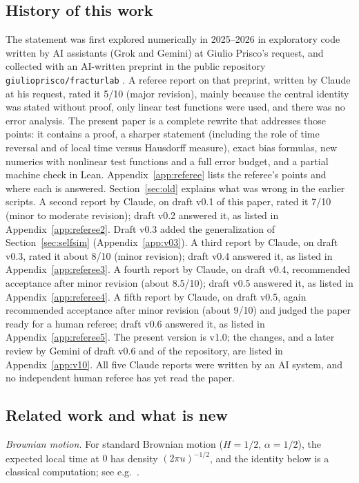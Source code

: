 \documentclass[11pt]{article}
\theoremstyle{remark}
\theoremstyle{definition}
\begin{document}
\subsection{History of this work}
The statement was first explored numerically in 2025--2026 in exploratory code written by AI assistants (Grok and Gemini) at Giulio Prisco's request, and collected with an AI-written preprint in the public repository \texttt{giulioprisco/fracturlab} \cite{fracturlab,Pri26}. A referee report on that preprint, written by Claude at his request, rated it 5/10 (major revision), mainly because the central identity was stated without proof, only linear test functions were used, and there was no error analysis. The present paper is a complete rewrite that addresses those points: it contains a proof, a sharper statement (including the role of time reversal and of local time versus Hausdorff measure), exact bias formulas, new numerics with nonlinear test functions and a full error budget, and a partial machine check in Lean. Appendix~\ref{app:referee} lists the referee's points and where each is answered. Section~\ref{sec:old} explains what was wrong in the earlier scripts. A second report by Claude, on draft v0.1 of this paper, rated it 7/10 (minor to moderate revision); draft v0.2 answered it, as listed in Appendix~\ref{app:referee2}. Draft v0.3 added the generalization of Section~\ref{sec:selfsim} (Appendix~\ref{app:v03}). A third report by Claude, on draft v0.3, rated it about 8/10 (minor revision); draft v0.4 answered it, as listed in Appendix~\ref{app:referee3}. A fourth report by Claude, on draft v0.4, recommended acceptance after minor revision (about 8.5/10); draft v0.5 answered it, as listed in Appendix~\ref{app:referee4}. A fifth report by Claude, on draft v0.5, again recommended acceptance after minor revision (about 9/10) and judged the paper ready for a human referee; draft v0.6 answered it, as listed in Appendix~\ref{app:referee5}. The present version is v1.0; the changes, and a later review by Gemini of draft v0.6 and of the repository, are listed in Appendix~\ref{app:v10}. All five Claude reports were written by an AI system, and no independent human referee has yet read the paper.

\subsection{Related work and what is new}\label{sec:related}
\emph{Brownian motion.} For standard Brownian motion ($H=1/2$, $\alpha=1/2$), the expected local time at $0$ has density $(2\pi u)^{-1/2}$, and the identity below is a classical computation; see e.g.\ \cite{RY99,MP10}.
\end{document}
